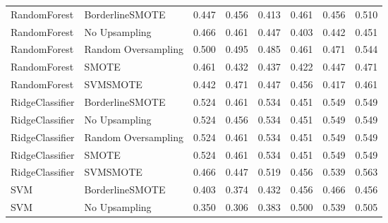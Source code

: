 \begin{tabular}{llllllll}
                RandomForest &     BorderlineSMOTE & 0.447 &                     0.456 &                 0.413 &                  0.461 &                                   0.456 &     0.510 \\
                RandomForest &       No Upsampling & 0.466 &                     0.461 &                 0.447 &                  0.403 &                                   0.442 &     0.451 \\
                RandomForest & Random Oversampling & 0.500 &                     0.495 &                 0.485 &                  0.461 &                                   0.471 &     0.544 \\
                RandomForest &               SMOTE & 0.461 &                     0.432 &                 0.437 &                  0.422 &                                   0.447 &     0.471 \\
                RandomForest &            SVMSMOTE & 0.442 &                     0.471 &                 0.447 &                  0.456 &                                   0.417 &     0.461 \\
             RidgeClassifier &     BorderlineSMOTE & 0.524 &                     0.461 &                 0.534 &                  0.451 &                                   0.549 &     0.549 \\
             RidgeClassifier &       No Upsampling & 0.524 &                     0.456 &                 0.534 &                  0.451 &                                   0.549 &     0.549 \\
             RidgeClassifier & Random Oversampling & 0.524 &                     0.461 &                 0.534 &                  0.451 &                                   0.549 &     0.549 \\
             RidgeClassifier &               SMOTE & 0.524 &                     0.461 &                 0.534 &                  0.451 &                                   0.549 &     0.549 \\
             RidgeClassifier &            SVMSMOTE & 0.466 &                     0.447 &                 0.519 &                  0.456 &                                   0.539 &     0.563 \\
                         SVM &     BorderlineSMOTE & 0.403 &                     0.374 &                 0.432 &                  0.456 &                                   0.466 &     0.456 \\
                         SVM &       No Upsampling & 0.350 &                     0.306 &                 0.383 &                  0.500 &                                   0.539 &     0.505 \\

\end{tabular}
